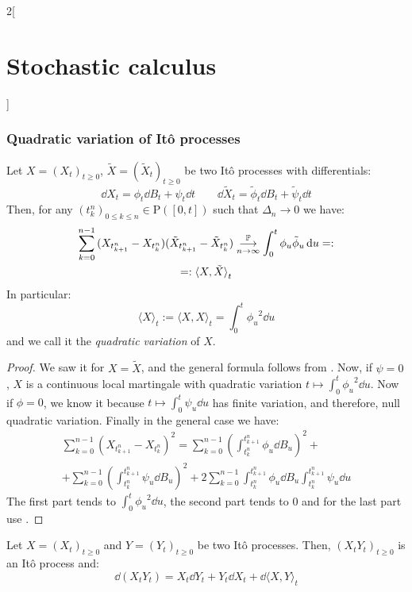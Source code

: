\documentclass[../../../main_math.tex]{subfiles}
\begin{document}
\begin{multicols}{2}[\section{Stochastic calculus}]
  \subsubsection{Quadratic variation of Itô processes}
  \begin{lemma}\label{SC:ito_quadratic_variation}
    Let $X={(X_t)}_{t\geq 0}$, $\tilde{X}=({\tilde{X}_t})_{t\geq 0}$ be two Itô processes with differentials:
    $$
      \dd{X_t}=\phi_t\dd{B_t}+\psi_t\dd{t}\qquad \dd{\tilde{X}_t}=\tilde{\phi}_t\dd{B_t}+\tilde{\psi}_t\dd{t}
    $$
    Then, for any ${(t_k^n)}_{0\leq k\leq n}\in \mathrm{P}([0,t])$ such that $\Delta_n\to 0$ we have:
    \begin{multline*}
      \sum_{k=0}^{n-1}{(X_{t_{k+1}^n}-X_{t_k^n})}{(\tilde{X}_{t_{k+1}^n}-\tilde{X}_{t_k^n})}\overset{\mathbb{P}}{\underset{n\to\infty}{\longrightarrow}} \int_0^t{\phi_u}{\tilde{\phi}_u}\dd{u}=:\\=:{\langle X,\tilde{X}\rangle}_t
    \end{multline*}
    In particular:
    $$
      {\langle X\rangle}_t:= {\langle X,X\rangle}_t=\int_0^t{\phi_u}^2\dd{u}
    $$
    and we call it the \emph{quadratic variation} of $X$.
  \end{lemma}
  \begin{proof}
    We saw it for $X=\tilde{X}$, and the general formula follows from . Now, if $\psi =0$, $X$ is a continuous local martingale with quadratic variation $t\mapsto \int_0^t{\phi_u}^2\dd{u}$. Now if $\phi=0$, we know it because $t\mapsto \int_0^t \psi_u\dd{u}$ has finite variation, and therefore, null quadratic variation. Finally in the general case we have:
    \begin{multline*}
      \sum_{k=0}^{n-1}{(X_{t_{k+1}^n}-X_{t_k^n})}^2=\sum_{k=0}^{n-1}{\left(\int_{t_k^n}^{t_{k+1}^n}\phi_u\dd{B_u}\right)}^2+\\+\sum_{k=0}^{n-1}{\left(\int_{t_k^n}^{t_{k+1}^n}\psi_u\dd{B_u}\right)}^2+2\sum_{k=0}^{n-1}\int_{t_k^n}^{t_{k+1}^n}\phi_u\dd{B_u}\int_{t_k^n}^{t_{k+1}^n}\psi_u\dd{u}
    \end{multline*}
    The first part tends to $\int_0^t{\phi_u}^2\dd{u}$, the second part tends to 0 and for the last part use .
  \end{proof}
  \begin{theorem}
    Let $X={(X_t)}_{t\geq 0}$ and $Y={(Y_t)}_{t\geq 0}$ be two Itô processes. Then, ${(X_tY_t)}_{t\geq 0}$ is an Itô process and:
    $$
      \dd{(X_tY_t)}=X_t\dd{Y_t}+Y_t\dd{X_t}+\dd{{\langle X,Y\rangle}_t}
$$
\end{theorem}
\end{multicols}
\end{document}
